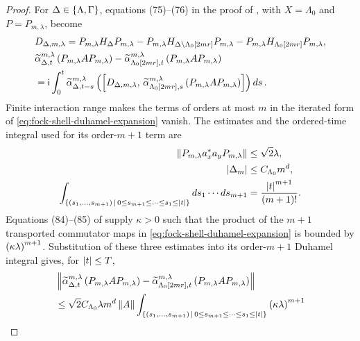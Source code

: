 \documentclass[11pt,a4paper]{article}
\theoremstyle{plain}
\theoremstyle{definition}
\theoremstyle{remark}
\begin{document}
\begin{proof}
For $\Delta\in\left\{ \Lambda,\Gamma \right\}$, equations (75)--(76) in the proof of
\cite[Lemma 4.10]{DeuchertLampartLemm001}, with $X=\Lambda_0$ and $P=P_{m,\lambda}$, become
\begin{equation}
\begin{aligned}
&
D_{\Delta,m,\lambda}
=
P_{m,\lambda}H_{\Delta}P_{m,\lambda}
-
P_{m,\lambda}H_{\Delta\setminus\Lambda_0[2 m r]}P_{m,\lambda}
-
P_{m,\lambda}H_{\Lambda_0[2 m r]}P_{m,\lambda},
\\ %
&
\fun{\widetilde{\alpha}_{\Delta,t}^{m,\lambda}}{P_{m,\lambda} A P_{m,\lambda}}
-
\fun{\widetilde{\alpha}_{\Lambda_0[2 m r],t}^{m,\lambda}}{P_{m,\lambda} A P_{m,\lambda}}
\\
& =
\imunit
\int_0^t
\fun{\widetilde{\alpha}_{\Delta,t-s}^{m,\lambda}}{
\commutator{D_{\Delta,m,\lambda}}{
\fun{\widetilde{\alpha}_{\Lambda_0[2 m r],s}^{m,\lambda}}{
P_{m,\lambda} A P_{m,\lambda}}}}
\opdmsr{s}.
\end{aligned}
\label{eq:fock-shell-duhamel-expansion}
\end{equation}
Finite interaction range makes the terms of orders at most $m$ in the iterated form of
\eqref{eq:fock-shell-duhamel-expansion} vanish.
The estimates and the ordered-time integral used for its order-$m+1$ term are
$$\begin{aligned}
\norm{P_{m,\lambda}\faadj{a_x}a_yP_{m,\lambda}}
& \leq
\sqrt{2}\lambda,
\\ %
\abscard{\Delta_m}
& \leq
C_{\Lambda_0}m^d,
\\ %
\int_{\set{(s_1,\ldots,s_{m+1})}{
0\leq s_{m+1}\leq\cdots\leq s_1\leq\abs{t}}}
\opdmsr{s_1}\cdots\opdmsr{s_{m+1}}
& =
\frac{\abs{t}^{m+1}}{\rbk{m+1}!}.
\end{aligned}$$
Equations (84)--(85) of \cite{DeuchertLampartLemm001} supply $\kappa>0$ such that the product of the $m+1$ transported
commutator maps in \eqref{eq:fock-shell-duhamel-expansion} is bounded by
$\left( \kappa\lambda \right)^{m+1}$.
Substitution of these three estimates into its order-$m+1$ Duhamel integral gives, for $\left| t \right|\leq T$,
\begin{equation}
\begin{aligned}
&
\norm{
\fun{\widetilde{\alpha}_{\Delta,t}^{m,\lambda}}{P_{m,\lambda} A P_{m,\lambda}}
-
\fun{\widetilde{\alpha}_{\Lambda_0[2 m r],t}^{m,\lambda}}{P_{m,\lambda} A P_{m,\lambda}}}
\\
& \leq
\sqrt{2}C_{\Lambda_0}\lambda m^d\norm{A}
\int_{\set{(s_1,\ldots,s_{m+1})}{
0\leq s_{m+1}\leq\cdots\leq s_1\leq\abs{t}}}
\rbk{\kappa\lambda}^{m+1}

\end{aligned}
\end{equation}
\end{proof}
\end{document}
